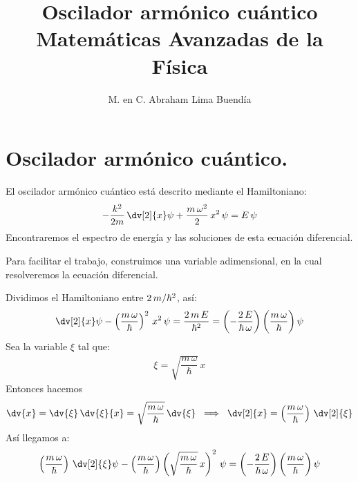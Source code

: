
\title{Oscilador armónico cuántico\\ \large{Matemáticas Avanzadas de la Física}\vspace{-3ex}}
\author{M. en C. Abraham Lima Buendía}
\date{ }

\vspace{-4cm}
\maketitle
\fontsize{14}{14}\selectfont
\section{Oscilador armónico cuántico.}

El oscilador armónico cuántico está descrito mediante el Hamiltoniano:
\begin{align*}
- \dfrac{k^{2}}{2 m} \, \dv[2]{x} \psi + \dfrac{m \, \omega^{2}}{2} \, x^{2} \, \psi
 = E \, \psi
\end{align*}
Encontraremos el espectro de energía y las soluciones de esta ecuación diferencial.
\par
Para facilitar el trabajo, construimos una variable adimensional, en la cual resolveremos la ecuación diferencial.
\par
Dividimos el Hamiltoniano entre $\- 2 \, m/ \hbar^{2}$, así:
\begin{align*}
\dv[2]{x} \psi - \left( \dfrac{m \, \omega}{\hbar} \right)^{2} \, x^{2} \, \psi =  \dfrac{2 \, m \, E}{\hbar^{2}} = \left( - \dfrac{2 \, E}{\hbar \, \omega} \right) \bigg( \dfrac{m \, \omega}{\hbar} \bigg) \, \psi
\end{align*}
Sea la variable $\xi$ tal que:
\begin{align*}
\xi = \sqrt{\dfrac{m \, \omega}{\hbar}} \, x
\end{align*}
Entonces hacemos
\begin{align*}
\dv{x} = \dv{\xi} \, \dv{\xi}{x} = \sqrt{\dfrac{m \, \omega}{\hbar}} \, \dv{\xi} \hspace{0.2cm} \Longrightarrow \hspace{0.2cm} \dv[2]{x} = \left( \dfrac{m \, \omega}{\hbar} \right) \, \dv[2]{\xi}
\end{align*}
Así llegamos a:
\begin{align*}
\left( \dfrac{m \, \omega}{\hbar} \right) \, \dv[2]{\xi} \psi - \left( \dfrac{m \, \omega}{\hbar} \right) \left( \sqrt{\dfrac{m \, \omega}{\hbar}} \, x \right)^{2} \, \psi = \left( - \dfrac{2 \, E}{\hbar \, \omega} \right) \bigg( \dfrac{m \, \omega}{\hbar} \bigg) \, \psi
\end{align*}
